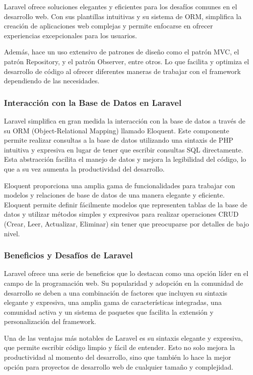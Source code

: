Laravel ofrece soluciones elegantes y eficientes para los desafíos comunes en el desarrollo web. Con sus plantillas intuitivas y su sistema de ORM, simplifica la creación de aplicaciones web complejas y permite enfocarse en ofrecer experiencias excepcionales para los usuarios. 

Además, hace un uso extensivo de patrones de diseño como el patrón MVC, el patrón Repository, y el patrón Observer, entre otros. Lo que facilita y optimiza el desarrollo de código al ofrecer diferentes maneras de trabajar con el framework dependiendo de las necesidades.

\subsubsection{Interacción con la Base de Datos en Laravel}
Laravel simplifica en gran medida la interacción con la base de datos a través de su ORM (Object-Relational Mapping) llamado Eloquent. Este componente permite realizar consultas a la base de datos utilizando una sintaxis de PHP intuitiva y expresiva en lugar de tener que escribir consultas SQL directamente. Esta abstracción facilita el manejo de datos y mejora la legibilidad del código, lo que a su vez aumenta la productividad del desarrollo.

Eloquent proporciona una amplia gama de funcionalidades para trabajar con modelos y relaciones de base de datos de una manera elegante y eficiente. Eloquent permite definir fácilmente modelos que representen tablas de la base de datos y utilizar métodos simples y expresivos para realizar operaciones CRUD (Crear, Leer, Actualizar, Eliminar) sin tener que preocuparse por detalles de bajo nivel.

\subsubsection{Beneficios y Desafíos de Laravel}
Laravel ofrece una serie de beneficios que lo destacan como una opción líder en el campo de la programación web. Su popularidad y adopción en la comunidad de desarrollo se deben a una combinación de factores que incluyen su sintaxis elegante y expresiva, una amplia gama de características integradas, una comunidad activa y un sistema de paquetes que facilita la extensión y personalización del framework.

Una de las ventajas más notables de Laravel es su sintaxis elegante y expresiva, que permite escribir código limpio y fácil de entender. Esto no solo mejora la productividad al momento del desarrollo, sino que también lo hace la mejor opción para proyectos de desarrollo web de cualquier tamaño y complejidad.

